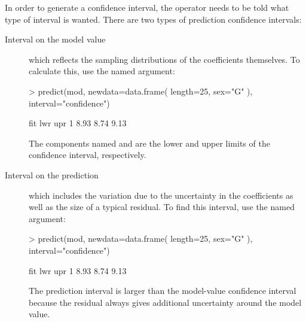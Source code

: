 In order to generate a confidence interval, the 
operator needs to be told what type of interval is wanted.  There are
two types of prediction confidence intervals:
\begin{description}
\item[Interval on the model value] which reflects the sampling
  distributions of the coefficients themselves.  To calculate this,
  use the  named argument:
\begin{Schunk}
\begin{Sinput}
> predict(mod, newdata=data.frame( length=25, sex="G" ), 
         interval="confidence")
\end{Sinput}
\begin{Soutput}
   fit  lwr  upr
1 8.93 8.74 9.13
\end{Soutput}
\end{Schunk}

The components named  and  are the lower and upper
limits of the confidence interval, respectively.

\item[Interval on the prediction] which includes the variation due to
  the uncertainty in the coefficients as well as the size of a typical
  residual.  To find this interval, use the
   named argument:
\begin{Schunk}
\begin{Sinput}
> predict(mod, newdata=data.frame( length=25, sex="G" ), 
         interval="confidence")
\end{Sinput}
\begin{Soutput}
   fit  lwr  upr
1 8.93 8.74 9.13
\end{Soutput}
\end{Schunk}

The prediction interval is larger than the model-value confidence
interval because the residual always gives additional uncertainty
around the model value.
\end{description} 


